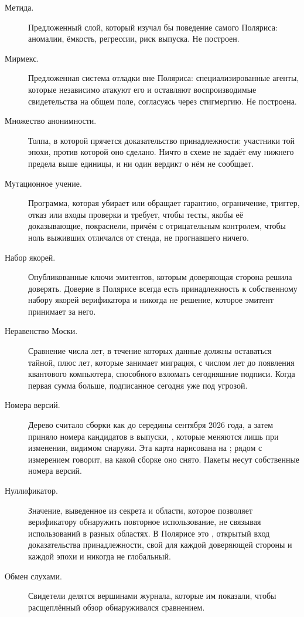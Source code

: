 \begin{description}
  \item[Метида.] Предложенный слой, который изучал бы поведение самого Поляриса: аномалии, ёмкость, регрессии,
    риск выпуска. Не построен.
  \item[Мирмекс.] Предложенная система отладки вне Поляриса: специализированные агенты, которые независимо
    атакуют его и оставляют воспроизводимые свидетельства на общем поле, согласуясь через
    стигмергию. Не построена.
  \item[Множество анонимности.] Толпа, в которой прячется доказательство принадлежности: участники той эпохи, против которой оно сделано. Ничто в схеме не задаёт ему нижнего предела выше единицы, и ни один вердикт о нём не сообщает.
  \item[Мутационное учение.] Программа, которая убирает или обращает гарантию, ограничение, триггер, отказ или входы проверки и требует, чтобы тесты, якобы её доказывающие, покраснели, причём с отрицательным контролем, чтобы ноль выживших отличался от стенда, не прогнавшего ничего.
  \item[Набор якорей.] Опубликованные ключи эмитентов, которым доверяющая сторона решила доверять. Доверие в Полярисе всегда есть принадлежность к собственному набору якорей верификатора и никогда не решение, которое эмитент принимает за него.
  \item[Неравенство Моски.] Сравнение числа лет, в течение которых данные должны оставаться тайной, плюс
    лет, которые занимает миграция, с числом лет до появления квантового компьютера, способного
    взломать сегодняшние подписи. Когда первая сумма больше, подписанное сегодня уже под угрозой.
  \item[Номера версий.] Дерево считало сборки как  до середины сентября 2026 года, а
    затем приняло номера кандидатов в выпуски, , которые меняются лишь при изменении,
    видимом снаружи. Эта карта нарисована на ;  рядом с измерением
    говорит, на какой сборке оно снято. Пакеты несут собственные номера версий.
  \item[Нуллификатор.] Значение, выведенное из секрета и области, которое позволяет верификатору обнаружить повторное использование, не связывая использований в разных областях. В Полярисе это , открытый вход доказательства принадлежности, свой для каждой доверяющей стороны и каждой эпохи и никогда не глобальный.
  \item[Обмен слухами.] Свидетели делятся вершинами журнала, которые им показали, чтобы расщеплённый обзор обнаруживался сравнением.

\end{description}

